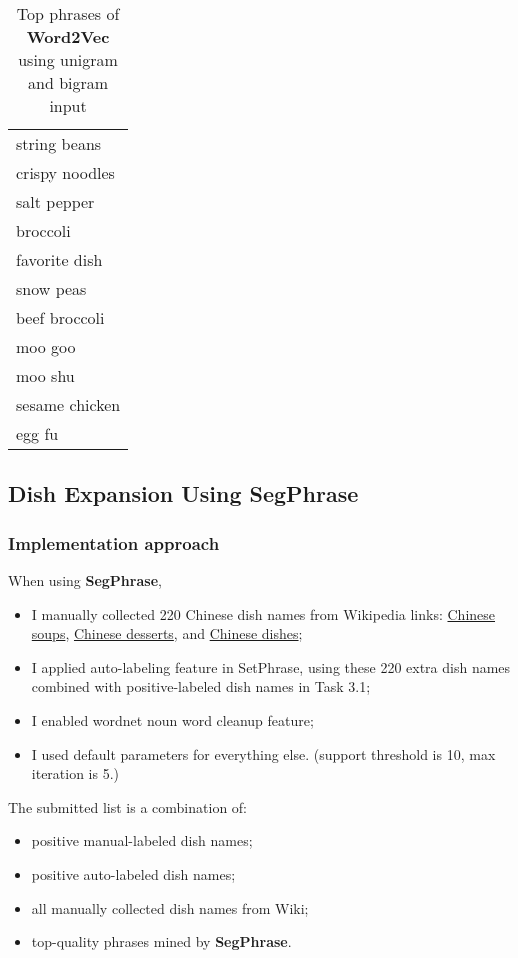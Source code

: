 \documentclass[11pt]{article}
\begin{document}
\begin{table}
  \centering
  \begin{tabular}{l}
    \hline
    string beans \\
    crispy noodles \\
    salt pepper \\
    broccoli \\
    favorite dish \\
    snow peas \\
    beef broccoli \\
    moo goo \\
    moo shu \\
    sesame chicken \\
    egg fu \\
    \hline
  \end{tabular}
  \caption{Top phrases of \textbf{Word2Vec} using unigram and bigram input}
  \label{tab:word2vec}
\end{table}


\subsection{Dish Expansion Using SegPhrase}
\subsubsection{Implementation approach}

When using \textbf{SegPhrase},
\begin{itemize}
  \item I manually collected 220 Chinese dish names from Wikipedia links: \href{https://en.wikipedia.org/wiki/List of Chinese soups}{Chinese soups}, \href{https://en.wikipedia.org/wiki/List of Chinese desserts}{Chinese desserts}, and \href{https://en.wikipedia.org/wiki/List of Chinese dishes}{Chinese dishes};
  \item I applied auto-labeling feature in SetPhrase, using these 220 extra dish names combined with positive-labeled dish names in Task 3.1;
  \item I enabled wordnet noun word cleanup feature;
  \item I used default parameters for everything else. (support threshold is 10, max iteration is 5.)
\end{itemize}

\vspace{1.5em}
The submitted list is a combination of:
\begin{itemize}
  \item positive manual-labeled dish names;
  \item positive auto-labeled dish names;
  \item all manually collected dish names from Wiki;
  \item top-quality phrases mined by \textbf{SegPhrase}.
\end{itemize}
\end{document}
